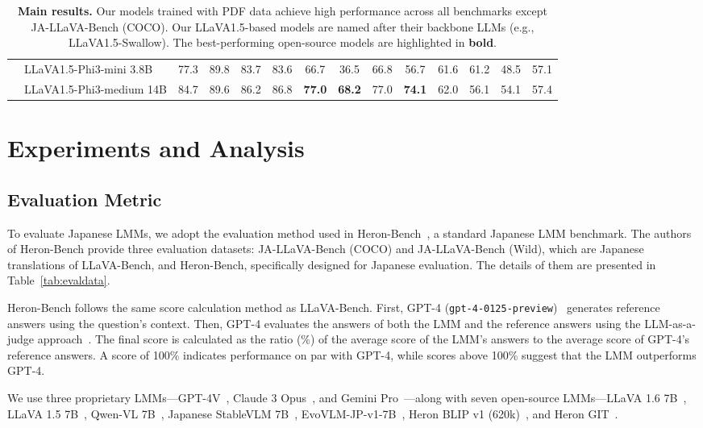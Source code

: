 \begin{table*}[t]
\begin{adjustbox}{width=\linewidth}
\begin{tabular}[t]{@{}ll|cccc|cccc|cccc@{}}
        & LLaVA1.5-Phi3-mini 3.8B & 77.3 & 89.8 & 83.7 & 83.6 & 66.7 & 36.5 & 66.8 & 56.7 & 61.6 & 61.2 & 48.5 & 57.1 \\ 
        & LLaVA1.5-Phi3-medium 14B & 84.7 & 89.6 & 86.2 & 86.8 & \textbf{77.0} & \textbf{68.2} & 77.0 & \textbf{74.1} & 62.0 & 56.1 & 54.1 & 57.4 \\ 
        \bottomrule
    \end{tabular}
    \end{adjustbox}
    \vspace{-2mm}
    \caption{\textbf{Main results.}
    Our models trained with PDF data achieve high performance across all benchmarks except JA-LLaVA-Bench (COCO).
    Our LLaVA1.5-based models are named after their backbone LLMs (e.g., LLaVA1.5-Swallow).
The best-performing open-source models are highlighted in \textbf{bold}.
    }
    \label{tab:main_results}
\end{table*} 


\section{Experiments and Analysis}

\subsection{Evaluation Metric} 
To evaluate Japanese LMMs, we adopt the evaluation method used in Heron-Bench~\cite{inoue2024heron}, a standard Japanese LMM benchmark.
The authors of Heron-Bench provide three evaluation datasets: JA-LLaVA-Bench (COCO) and JA-LLaVA-Bench (Wild), which are Japanese translations of LLaVA-Bench\cite{llava}, and Heron-Bench, specifically designed for Japanese evaluation.
The details of them are presented in Table~\ref{tab:evaldata}.

Heron-Bench follows the same score calculation method as LLaVA-Bench.
First, GPT-4 (\texttt{gpt-4-0125-preview})~\cite{openai2023gpt4} generates reference answers using the question's context.
Then, GPT-4 evaluates the answers of both the LMM and the reference answers using the LLM-as-a-judge approach~\cite{judge}.
The final score is calculated as the ratio (\%) of the average score of the LMM’s answers to the average score of GPT-4’s reference answers.
A score of 100\% indicates performance on par with GPT-4, while scores above 100\% suggest that the LMM outperforms GPT-4.


We use three proprietary LMMs—GPT-4V~\cite{openai2023gpt4}, Claude 3 Opus~\cite{anthropic2024claude3}, and Gemini Pro~\cite{geminipro}—along with seven open-source LMMs—LLaVA 1.6 7B~\cite{liu2024llavanext}, LLaVA 1.5 7B~\cite{llava}, Qwen-VL 7B~\cite{bai2023qwen}, Japanese StableVLM 7B~\cite{JapaneseStableVLM}, EvoVLM-JP-v1-7B~\cite{akiba2025evolutionary}, Heron BLIP v1 (620k)~\cite{BlipJapaneseStableLM}, and Heron GIT~\cite{inoue2024heron}.


